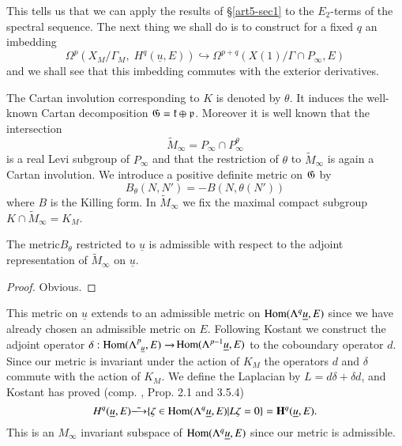 This tells us that we can apply the results of \S \ref{art5-sec1} to the $E_2$-terms of the spectral sequence. The next thing we shall do is to construct for a fixed $q$ an imbedding
$$
\Omega^p (X_M / \Gamma_M, \; H^q (\underline{u}, E)) \hookrightarrow \Omega^{p+q} (X (1) / \Gamma \cap P_\infty, E)
$$
and we shall see that this imbedding commutes with the exterior derivatives.

The Cartan involution corresponding to $K$ is denoted by $\theta$. It induces the well-known Cartan decomposition $\mathfrak{G} = \mathfrak{k} \oplus \mathfrak{p}$. Moreover it is well known that the intersection
$$
\tilde{M}_\infty = P_\infty \cap P^\theta_\infty
$$
is a real Levi subgroup of $P_\infty$ and that the restriction of $\theta$ to $\tilde{M}_\infty$ is again a Cartan involution. We introduce a positive definite metric on $\mathfrak{G}$ by
$$
B_\theta (N , N') = - B (N, \theta (N'))
$$
where $B$ is the Killing form. In $\tilde{M}_\infty$ we fix the maximal compact subgroup $K \cap \tilde{M}_\infty = K_M$.

\begin{lemma}\label{art5-lem2.4}
The metric\pageoriginale $B_\theta$ restricted to $\underline{u}$ is admissible with respect to the adjoint representation of $\tilde{M}_\infty$ on $\underline{u}$.
\end{lemma}

\begin{proof}
Obvious.
\end{proof}

This metric on $\underline{u}$ extends to an admissible metric on $\operatorname{Hom} (\Lambda^q \underline{u}, E)$ since we have already chosen an admissible metric on $E$. Following Kostant \cite{art5-key9} we construct the adjoint operator $\delta : \operatorname{Hom} (\Lambda^p_{\;\;\underline{u}} , E ) \to$\break $\operatorname{Hom} (\Lambda^{p-1} \underline{u}, E)$ to the coboundary operator $d$. Since our metric is invariant under the action of $K_M$ the operators $d$ and $\delta$ commute with the action of $K_M$. We define the Laplacian by $L = d \delta + \delta d$, and Kostant has proved (comp. \cite{art5-key9}, Prop. 2.1 and 3.5.4)
$$
H^q (\underline{u}, E) \tilde{\longrightarrow} \{\zeta \in \operatorname{Hom} (\Lambda^q \underline{u}, E) | L \zeta = 0\} = \mathbf{H}^q (\underline{u}, E).
$$
This is an $M_\infty$ invariant subspace of $\operatorname{Hom} (\Lambda^q \underline{u}, E)$ since our metric is admissible.

